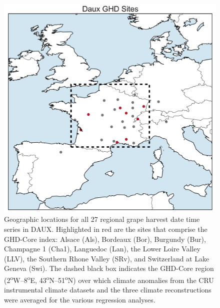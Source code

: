 \documentclass[12pt]{article}
\begin{document}
\begin{figure}
\center
\includegraphics[width=1.0\columnwidth,scale=2]{SUPP_fig_01_map_sites.png}
\caption{Geographic locations for all 27 regional grape harvest date time series in DAUX. Highlighted in red are the sites that comprise the GHD-Core index: Alsace (Als), Bordeaux (Bor), Burgundy (Bur), Champagne 1 (Cha1), Languedoc (Lan), the Lower Loire Valley (LLV), the Southern Rhone Valley (SRv), and Switzerland at Lake Geneva (Swi). The dashed black box indicates the GHD-Core region (2\textsuperscript{o}W--8\textsuperscript{o}E, 43\textsuperscript{o}N--51\textsuperscript{o}N) over which climate anomalies from the CRU instrumental climate datasets and the three climate reconstructions were averaged for the various regression analyses.}
\end{figure}

\clearpage
\end{document}
